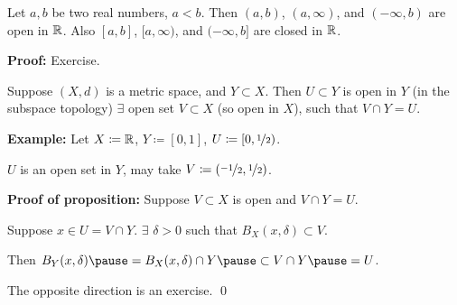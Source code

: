 \documentclass[10pt,aspectratio=169]{beamer}
\begin{document}
\begin{frame}

\begin{proposition}
Let $a, b$ be two real numbers, $a < b$.
\pause
Then $(a,b)$, $(a,\infty)$,
and $(-\infty,b)$ are open in ${\mathbb{R}}$.
\pause
Also $[a,b]$, $[a,\infty)$,
and $(-\infty,b]$ are closed in ${\mathbb{R}}$.
\end{proposition}

\pause
\textbf{Proof:} Exercise.

\pause
\begin{proposition}
Suppose $(X,d)$ is a metric space, and $Y \subset X$.
\pause
Then $U \subset Y$
is open in $Y$ (in the subspace topology) \wiffif
$\exists$ open set $V \subset X$ (so open in $X$), such that
$V \cap Y = U$.
\end{proposition}

\pause
\textbf{Example:}
Let $X \coloneqq {\mathbb{R}}$, $Y \coloneqq [0,1]$, $U \coloneqq [0,\nicefrac{1}{2})$.

\pause
$U$ is an open set in $Y$, may take $V \coloneqq (\nicefrac{-1}{2},\nicefrac{1}{2})$.

\pause
\medskip

\textbf{Proof of proposition:}
Suppose $V \subset X$ is open
\pause
and $V \cap Y = U$.

\pause
Suppose $x \in U = V \cap Y$.
\pause
\quad
$\exists$ $\delta > 0$ such that $B_X(x,\delta) \subset V$.

\pause
\medskip

Then
$
B_Y(x,\delta)
\pause
= B_X(x,\delta) \cap Y
\pause
\subset V \cap Y
\pause
= U$.

\pause
\medskip

The opposite direction is an exercise.
\qed


\end{frame}
\end{document}

